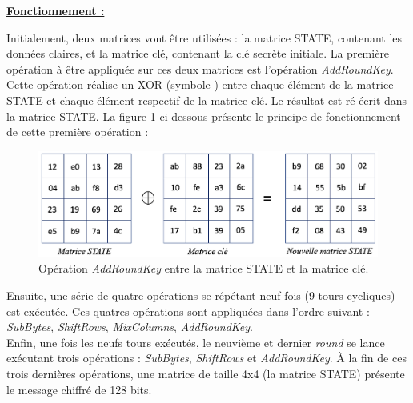 \documentclass[10pt, oneside, a4paper]{article}
\begin{document}
\underline{\textbf{Fonctionnement :}} 

Initialement, deux matrices vont être utilisées : la matrice STATE, contenant les données claires, et la matrice clé, contenant la clé secrète initiale. La première opération à être appliquée sur ces deux matrices est l'opération \textit{AddRoundKey}. Cette opération réalise un XOR (symbole \oplus) entre chaque élément de la matrice STATE et chaque élément respectif de la matrice clé. Le résultat est ré-écrit dans la matrice STATE. La figure \ref{fig:XOR} ci-dessous présente le principe de fonctionnement de cette première opération :
\begin{figure}[htbp]
    \centering
    \includegraphics[scale=0.55]{image/XOR}
    \caption{Opération \textit{AddRoundKey} entre la matrice STATE et la matrice clé.}
    \label{fig:XOR}
\end{figure}

\hspace{-0.5 cm}Ensuite, une série de quatre opérations se répétant neuf fois (9 tours cycliques) est exécutée. Ces quatres opérations sont appliquées dans l'ordre suivant : \textit{SubBytes}, \textit{ShiftRows}, \textit{MixColumns}, \textit{AddRoundKey}. \\
Enfin, une fois les neufs tours exécutés, le neuvième et dernier \textit{round} se lance exécutant trois opérations : \textit{SubBytes}, \textit{ShiftRows} et \textit{AddRoundKey}. À la fin de ces trois dernières opérations, une matrice de taille 4x4 (la matrice STATE) présente le message chiffré de 128 bits.
\end{document}
